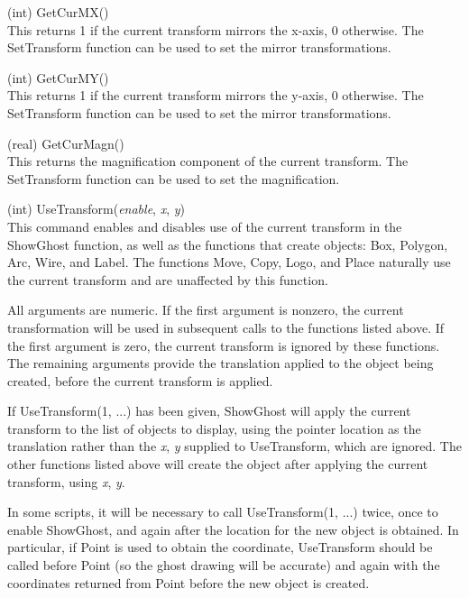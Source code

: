 \begin{description}
\item{(int) \vt GetCurMX()}\\
This returns 1 if the current transform mirrors the x-axis, 0
otherwise.  The {\vt SetTransform} function can be used to set the
mirror transformations.

\item{(int) \vt GetCurMY()}\\
This returns 1 if the current transform mirrors the y-axis, 0
otherwise.  The {\vt SetTransform} function can be used to set the
mirror transformations.

\item{(real) \vt GetCurMagn()}\\
This returns the magnification component of the current transform. 
The {\vt SetTransform} function can be used to set the magnification.

\item{(int) \vt UseTransform({\it enable\/}, {\it x\/}, {\it y\/})}\\
This command enables and disables use of the current transform in the
{\vt ShowGhost} function, as well as the functions that create
objects:  {\vt Box}, {\vt Polygon}, {\vt Arc}, {\vt Wire}, and {\vt
Label}.  The functions {\vt Move}, {\vt Copy}, {\vt Logo}, and {\vt
Place} naturally use the current transform and are unaffected by this
function.

All arguments are numeric.  If the first argument is nonzero, the
current transformation will be used in subsequent calls to the
functions listed above.  If the first argument is zero, the current
transform is ignored by these functions.  The remaining arguments
provide the translation applied to the object being created, before
the current transform is applied.

If {\vt UseTransform(1, ...)} has been given, {\vt ShowGhost} will
apply the current transform to the list of objects to display, using
the pointer location as the translation rather than the {\it x}, {\it
y} supplied to {\vt UseTransform}, which are ignored.  The other
functions listed above will create the object after applying the
current transform, using {\it x}, {\it y}.

In some scripts, it will be necessary to call {\vt UseTransform(1,
...)} twice, once to enable {\vt ShowGhost}, and again after the
location for the new object is obtained.  In particular, if {\vt
Point} is used to obtain the coordinate, {\vt UseTransform} should be
called before {\vt Point} (so the ghost drawing will be accurate) and
again with the coordinates returned from {\vt Point} before the new
object is created.


\end{description}
